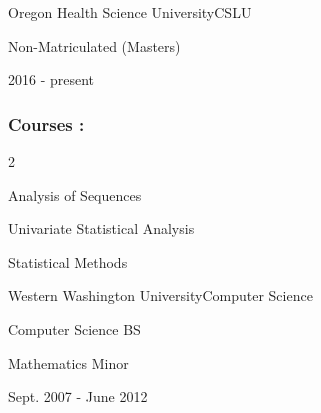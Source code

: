 \documentclass{article}
\newenvironment{mylist}[2]{
  \subsubsection*{#1}
  \begin{multicols}{#2}
  \small
  \begin{list}{}{}
   \setlength{\topsep}{0pt}
   \setlength{\itemsep}{1pt}
   \setlength{\parskip}{0pt}
   \setlength{\parsep}{0pt}}{\end{list}\end{multicols}\normalsize}
\newenvironment{*mylist}[2]{
  \subsection*{#1\hfill#2}
  \small
  \begin{list}{}{}
   \setlength{\topsep}{0pt}
   \setlength{\itemsep}{1pt}
   \setlength{\parskip}{0pt}
   \setlength{\parsep}{0pt}}{\end{list}\normalsize}
\begin{document}

\begin{*mylist}{Oregon Health Science University}{CSLU}
\item Non-Matriculated (Masters)
\item 2016 - present
\end{*mylist}

\begin{mylist}{Courses :}{2}
\item Analysis of Sequences
\item Univariate Statistical Analysis
\item Statistical Methods
\end{mylist}

\begin{comment}
\subsection*{Continued Education}

\begin{mylist}{Courses :}{2}
\item Agile Machine Learning
\item Probabilistic Programming Summer Program
\item Functional Programming in Scala
\item Applied Cryptography
\end{mylist}
\end{comment}

\begin{*mylist}{Western Washington University}{Computer Science}
\item Computer Science BS
\item Mathematics Minor
\item Sept. 2007 - June 2012
\end{*mylist}
\end{document}
